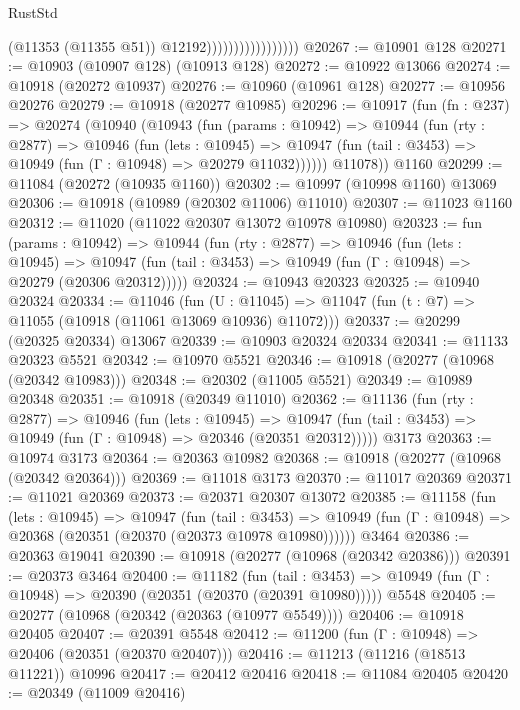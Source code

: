 \begin{lexlean}{RustStd}
\begin{coremodule}
{{{{{{{{{{{{{{{{{{{                                      (@11353 (@11355 @51))
                                      @12192)))))))))))))))))
@20267 := @10901 @128
@20271 := @10903 (@10907 @128) (@10913 @128)
@20272 := @10922 @13066
@20274 := @10918 (@20272 @10937)
@20276 := @10960 (@10961 @128)
@20277 := @10956 @20276
@20279 := @10918 (@20277 @10985)
@20296 := @10917
    (fun (fn : @237) =>
    @20274
      (@10940
        (@10943
          (fun (params : @10942) =>
          @10944
            (fun (rty : @2877) =>
            @10946
              (fun (lets : @10945) =>
              @10947 (fun (tail : @3453) => @10949 (fun (Γ : @10948) => @20279 @11032))))))
        @11078))
    @1160
@20299 := @11084 (@20272 (@10935 @1160))
@20302 := @10997 (@10998 @1160) @13069
@20306 := @10918 (@10989 (@20302 @11006) @11010)
@20307 := @11023 @1160
@20312 := @11020 (@11022 @20307 @13072 @10978 @10980)
@20323 := fun (params : @10942) =>
  @10944
    (fun (rty : @2877) =>
    @10946
      (fun (lets : @10945) =>
      @10947 (fun (tail : @3453) => @10949 (fun (Γ : @10948) => @20279 (@20306 @20312)))))
@20324 := @10943 @20323
@20325 := @10940 @20324
@20334 := @11046
    (fun (U : @11045) => @11047 (fun (t : @7) => @11055 (@10918 (@11061 @13069 @10936) @11072)))
@20337 := @20299 (@20325 @20334) @13067
@20339 := @10903 @20324 @20334
@20341 := @11133 @20323 @5521
@20342 := @10970 @5521
@20346 := @10918 (@20277 (@10968 (@20342 @10983)))
@20348 := @20302 (@11005 @5521)
@20349 := @10989 @20348
@20351 := @10918 (@20349 @11010)
@20362 := @11136
    (fun (rty : @2877) =>
    @10946
      (fun (lets : @10945) =>
      @10947 (fun (tail : @3453) => @10949 (fun (Γ : @10948) => @20346 (@20351 @20312)))))
    @3173
@20363 := @10974 @3173
@20364 := @20363 @10982
@20368 := @10918 (@20277 (@10968 (@20342 @20364)))
@20369 := @11018 @3173
@20370 := @11017 @20369
@20371 := @11021 @20369
@20373 := @20371 @20307 @13072
@20385 := @11158
    (fun (lets : @10945) =>
    @10947
      (fun (tail : @3453) =>
      @10949 (fun (Γ : @10948) => @20368 (@20351 (@20370 (@20373 @10978 @10980))))))
    @3464
@20386 := @20363 @19041
@20390 := @10918 (@20277 (@10968 (@20342 @20386)))
@20391 := @20373 @3464
@20400 := @11182
    (fun (tail : @3453) => @10949 (fun (Γ : @10948) => @20390 (@20351 (@20370 (@20391 @10980)))))
    @5548
@20405 := @20277 (@10968 (@20342 (@20363 (@10977 @5549))))
@20406 := @10918 @20405
@20407 := @20391 @5548
@20412 := @11200 (fun (Γ : @10948) => @20406 (@20351 (@20370 @20407)))
@20416 := @11213 (@11216 (@18513 @11221)) @10996
@20417 := @20412 @20416
@20418 := @11084 @20405
@20420 := @20349 (@11009 @20416)
}}}}}}}}}}}}}}}}}}}
\end{coremodule}
\end{lexlean}
